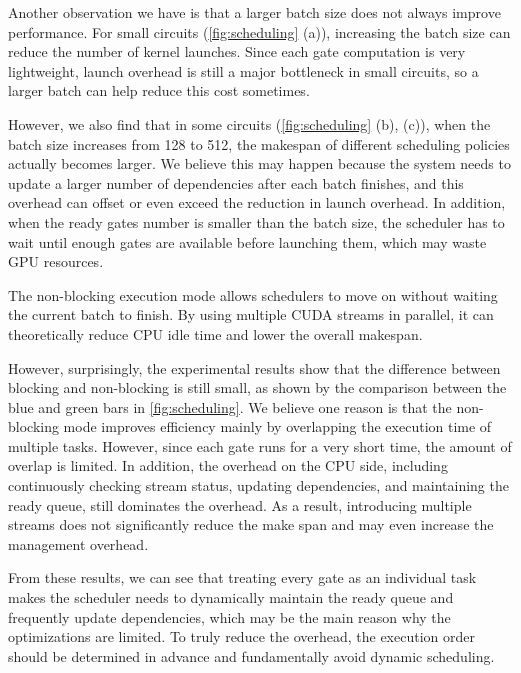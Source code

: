 \documentclass[sigconf,screen,nonacm]{acmart}
\begin{document}
    Another observation we have is that a larger batch size does not always improve performance. For small circuits (\autoref{fig:scheduling} (a)), increasing the batch size can reduce the number of kernel launches. Since each gate computation is very lightweight, launch overhead is still a major bottleneck in small circuits, so a larger batch can help reduce this cost sometimes. 
    
    However, we also find that in some circuits (\autoref{fig:scheduling} (b), (c)), when the batch size increases from 128 to 512, the makespan of different scheduling policies actually becomes larger. We believe this may happen because the system needs to update a larger number of dependencies after each batch finishes, and this overhead can offset or even exceed the reduction in launch overhead. In addition, when the ready gates number is smaller than the batch size, the scheduler has to wait until enough gates are available before launching them, which may waste GPU resources. 
    
    The non-blocking execution mode allows schedulers to move on without waiting the current batch to finish. By using multiple CUDA streams in parallel, it can theoretically reduce CPU idle time and lower the overall makespan. 
    
    However, surprisingly, the experimental results show that the difference between blocking and non-blocking is still small, as shown by the comparison between the blue and green bars in \autoref{fig:scheduling}. We believe one reason is that the non-blocking mode improves efficiency mainly by overlapping the execution time of multiple tasks. However, since each gate runs for a very short time, the amount of overlap is limited. In addition, the overhead on the CPU side, including continuously checking stream status, updating dependencies, and maintaining the ready queue, still dominates the overhead. As a result, introducing multiple streams does not significantly reduce the make span and may even increase the management overhead. 

    From these results, we can see that treating every gate as an individual task makes the scheduler needs to dynamically maintain the ready queue and frequently update dependencies, which may be the main reason why the optimizations are limited. To truly reduce the overhead, the execution order should be determined in advance and fundamentally avoid dynamic scheduling. 
    
\end{document}
